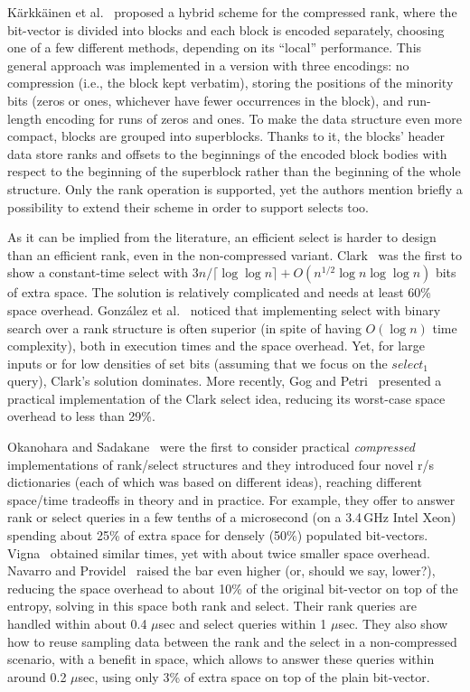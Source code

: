 \documentclass{llncs}
\begin{document}
K{\"{a}}rkk{\"{a}}inen et al.~\cite{KKP14} proposed a hybrid scheme 
for the compressed rank, where the bit-vector is divided into blocks 
and each block is encoded separately, choosing one of a few different methods, 
depending on its ``local'' performance.
This general approach was implemented in a version with three encodings:
no compression (i.e., the block kept verbatim), storing the positions of the 
minority bits (zeros or ones, whichever have fewer occurrences in the block), 
and run-length encoding for runs of zeros and ones.
To make the data structure even more compact, blocks are grouped into 
superblocks. 
Thanks to it, the blocks' header data store ranks and offsets to 
the beginnings of the encoded block bodies with respect to the beginning 
of the superblock rather than the beginning of the whole structure.
Only the rank operation is supported, yet the authors mention briefly 
a possibility to extend their scheme in order to support selects too.

As it can be implied from the literature, an efficient select 
is harder to design than an efficient rank, even in the non-compressed variant.
Clark~\cite{Clark1996} was the first to show a constant-time select 
with $3n/ \lceil \log\log n \rceil + O(n^{1/2} \log n \log\log n)$ 
bits of extra space.
The solution is relatively complicated and needs at least 60\% space overhead.
Gonz{\'a}lez et al.~\cite{GGMN05} noticed that implementing 
select with binary search over a rank structure is often superior
(in spite of having $O(\log n)$ time complexity), 
both in execution times and the space overhead.
Yet, for large inputs or for low densities of set bits (assuming 
that we focus on the $select_1$ query), Clark's solution dominates.
More recently, Gog and Petri~\cite{GP13} presented a practical implementation 
of the Clark select idea, reducing its worst-case space overhead 
to less than 29\%.

Okanohara and Sadakane~\cite{OkanoharaS07} were the first to consider 
practical {\em compressed} implementations of rank/select structures 
and they introduced four novel r/s dictionaries 
(each of which was based on different ideas), reaching different 
space/time tradeoffs in theory and in practice.
For example, they offer to answer rank or select queries 
in a few tenths of a microsecond (on a 3.4\,GHz Intel Xeon) 
spending about 25\% of extra space for densely (50\%) populated bit-vectors.
Vigna~\cite{V08} obtained similar times, yet with about twice smaller 
space overhead.
Navarro and Providel~\cite{NPsea12} raised the bar even higher 
(or, should we say, lower?), reducing the space overhead to about 
10\% of the original bit-vector on top of the entropy, solving 
in this space both rank and select. 
Their rank queries are handled within about 0.4 $\mu$sec and 
select queries within 1 $\mu$sec.
They also show how to reuse sampling data between the rank and the select 
in a non-compressed scenario, 
with a benefit in space, which allows to answer these queries 
within around 0.2 $\mu$sec, using only 3\% of extra space on top of 
the plain bit-vector.
\end{document}
